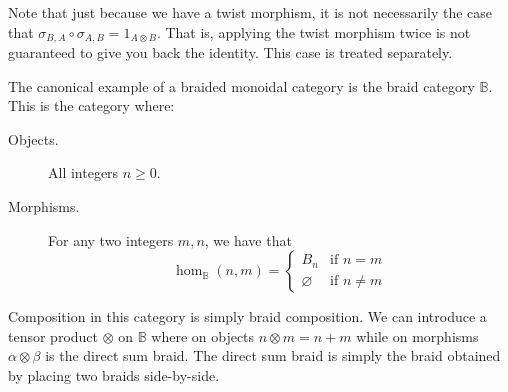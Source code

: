 Note that just because we have a twist morphism, it is not necessarily the case 
that $\sigma_{B,A}\circ\sigma_{A,B} = 1_{A\otimes B}$. That is, applying the twist morphism 
twice is not guaranteed to give you back the identity. This case is treated separately.  

\begin{example}
    The canonical example of a braided monoidal category is the braid category $\mathbb{B}$.
    This is the category where:
    \begin{description}
        \item[Objects.] All integers $n \ge 0$.
        \item[Morphisms.] For any two integers $m, n$, we have that 
        \[
            \hom_{\mathbb{B}}(n,m)
            =
            \begin{cases}
                B_n & \text{if } n = m\\
                \varnothing & \text{if } n \ne m
            \end{cases}
        \]
    \end{description} 
    Composition in this category is simply braid composition. We can introduce a tensor 
    product $\otimes$ on $\mathbb{B}$ where on objects $n \otimes m = n + m$ 
    while on morphisms $\alpha \otimes \beta$ is the direct sum braid. The direct 
    sum braid is simply the braid obtained by placing two braids side-by-side.
    \begin{center}
        \raisebox{1.5cm}{$\otimes$}
\end{center}
\end{example}
